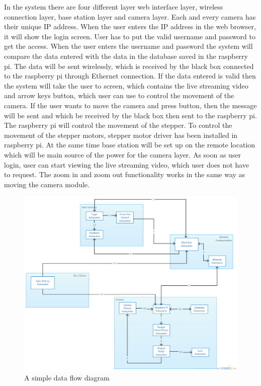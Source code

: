 In the system there are four different layer web interface layer, wireless connection layer, base station layer and camera layer. Each and every camera has their unique IP address. When the user enters the IP address in the web browser, it will show the login screen. User has to put the valid username and password to get the access. When the user enters the username and password the system will compare the data entered with the data in the database saved in the raspberry pi. The data will be sent wirelessly, which is received by the black box connected to the raspberry pi through Ethernet connection. If the data entered is valid then the system will take the user to screen, which contains the live streaming video and arrow keys button, which user can use to control the movement of the camera. If the user wants to move the camera and press button, then the message will be sent and which be received by the black box then sent to the raspberry pi. The raspberry pi will control the movement of the stepper. To control the movement of the stepper motors, stepper motor driver has been installed in raspberry pi. At the same time base station will be set up on the remote location which will be main source of the power for the camera layer. As soon as user login, user can start viewing the live streaming video, which user does not have to request. The zoom in and zoom out functionality works in the same way as moving the camera module.


\begin{figure}[h!]
	\centering
 	\includegraphics[width=\textwidth]{images/ADSdiagrams/subsystemdefinitionsanddataflow.png}
 \caption{A simple data flow diagram}
\end{figure}
